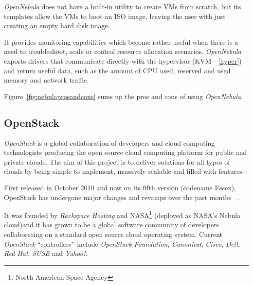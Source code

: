 
\textit{OpenNebula} does not have a built-in utility to create VMs from scratch, but its templates allow the VMs to boot an ISO image, leaving the user with just creating an empty hard disk image.

It provides monitoring capabilities which become rather useful when there is a need to troubleshoot, scale or control resource allocation scenarios. \textit{OpenNebula} exports drivers that communicate directly with the hypervisor (KVM - \ref{hyper}) and return useful data, such as the amount of CPU used, reserved and used memory and network traffic.\cite{open-clouds}

Figure~\ref{fig:nebulaprosandcons} sums up the pros and cons of using \textit{OpenNebula}.


\subsection{OpenStack}\label{subsec:openstack}

\textit{OpenStack} is a global collaboration of developers and cloud computing technologists producing the open source cloud computing platform for public and private clouds. The aim of this project is to deliver solutions for all types of clouds by being simple to implement, massively scalable and filled with features. 

First released in October 2010 and now on its fifth version (codename Essex), OpenStack has undergone major changes and revamps over the past months ~\cite{openstack}.

It was founded by \textit{Rackspace Hosting} and NASA\footnote{North American Space Agency} (deployed as NASA's Nebula cloud\cite{needs cite})and it has grown to be a global software community of developers collaborating on a standard open source cloud operating system. Current \textit{OpenStack} ``controllers'' include \textit{OpenStack Foundation}, \textit{Canonical}, \textit{Cisco}, \textit{Dell}, \textit{Red Hat}, \textit{SUSE} and \textit{Yahoo!}. \cite{https://github.com/dellcloudedge/crowbar/wiki/OpenStack-Essex-Deploy-Day}

